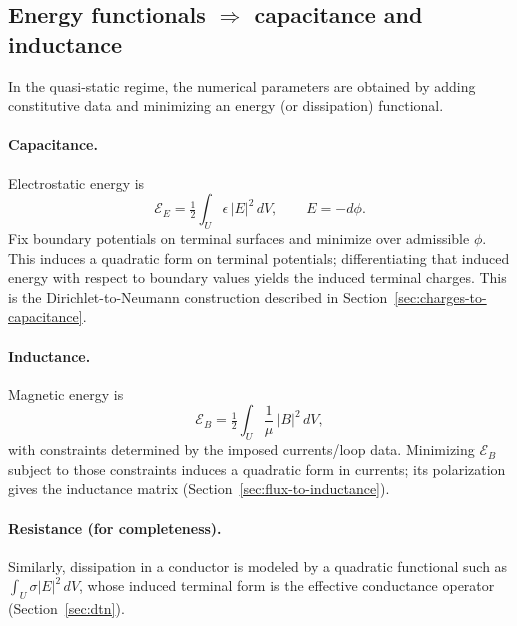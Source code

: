 \documentclass[11pt]{article}
\begin{document}
\subsection{Energy functionals \texorpdfstring{$\Rightarrow$}{=>} capacitance and inductance}
In the quasi-static regime, the numerical parameters are obtained by adding constitutive data and minimizing an energy (or dissipation) functional.

\paragraph{Capacitance.}
Electrostatic energy is
\[
\mathcal{E}_E=\tfrac12\int_U \epsilon\,|E|^2\,dV,
\qquad E=-d\phi.
\]
Fix boundary potentials on terminal surfaces and minimize over admissible $\phi$.
This induces a quadratic form on terminal potentials; differentiating that induced energy with respect to boundary values yields the induced terminal charges.
This is the Dirichlet-to-Neumann construction described in Section~\ref{sec:charges-to-capacitance}.

\paragraph{Inductance.}
Magnetic energy is
\[
\mathcal{E}_B=\tfrac12\int_U \frac{1}{\mu}\,|B|^2\,dV,
\]
with constraints determined by the imposed currents/loop data.
Minimizing $\mathcal{E}_B$ subject to those constraints induces a quadratic form in currents; its polarization gives the inductance matrix (Section~\ref{sec:flux-to-inductance}).

\paragraph{Resistance (for completeness).}
Similarly, dissipation in a conductor is modeled by a quadratic functional such as $\int_U \sigma |E|^2\,dV$, whose induced terminal form is the effective conductance operator (Section~\ref{sec:dtn}).



\end{document}
